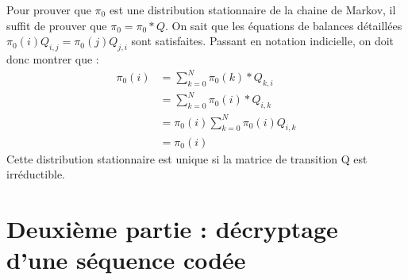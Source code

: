 \documentclass[11pt]{report}
\begin{document}
\subsubsection{}
Pour prouver que $\pi_0$ est une distribution stationnaire de la chaine de Markov, il suffit de prouver que $\pi_0=\pi_0 *Q$. 
On sait que les équations de balances détaillées $\pi_0(i)Q_{i,j} = \pi_0(j)Q_{j,i}$ sont satisfaites.
Passant en notation indicielle, on doit donc montrer que :
\begin{align*}
\pi_0(i) &= \sum^{N}_{k=0} \pi_0(k)*Q_{k,i} \\
& = \sum^{N}_{k=0} \pi_0(i)*Q_{i,k} \\
& = \pi_0(i) \sum^{N}_{k=0} \pi_0(i) Q_{i,k} \\
& = \pi_0(i)
\end{align*}
Cette distribution stationnaire est unique si la matrice de transition Q est irréductible.
\subsubsection{}
\section{Deuxième partie : décryptage d’une séquence codée}
\subsubsection{}
\subsubsection{}
\subsubsection{}
\subsubsection{}
\subsubsection{}
\end{document}
